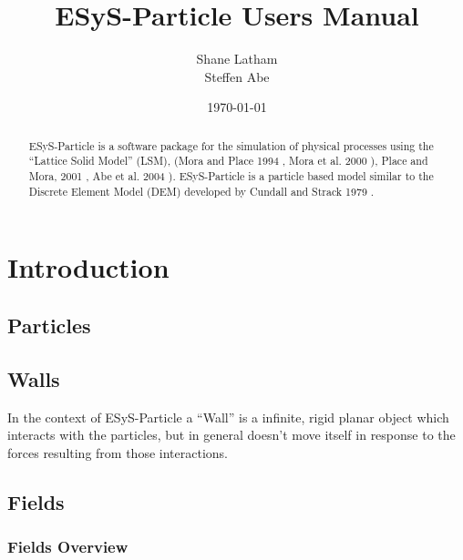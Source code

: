 \documentclass{manual}
\title{ESyS-Particle Users Manual}
\author{Shane Latham \\ Steffen Abe}
\date{\today}
\begin{document}
\maketitle

\begin{abstract}

ESyS-Particle is a software package for the simulation of physical processes using the ``Lattice Solid Model'' (LSM), (Mora and Place 1994 \cite{stick-slip}, Mora et al. 2000 \cite{geocomplex}), Place and Mora, 2001 \cite{lsm-packing}, Abe et al. 2004 \cite{lsm-parallel1}). ESyS-Particle  is a particle based model similar to the Discrete Element Model (DEM) developed by Cundall and Strack 1979 \cite{cundall-dem}. 

\end{abstract}

\tableofcontents

\chapter{Introduction}

\section{Particles}

\section{Walls}
\label{sec:walls}

In the context of ESyS-Particle a ``Wall'' is a infinite, rigid planar object which interacts with the particles, but in general doesn't move itself in response to the forces resulting from those interactions. 


\section{Fields}
\subsection{Fields Overview}
\end{document}
